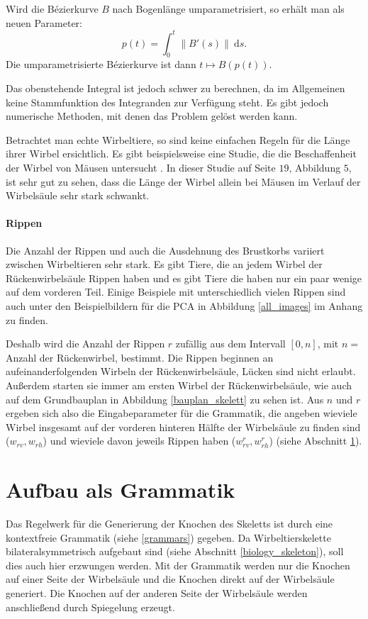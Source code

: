 Wird die Bézierkurve $B$ nach Bogenlänge umparametrisiert, so erhält man als neuen Parameter:
\[p(t) = \int_0^t \| B'(s) \| ~\mathrm{d}s. \]
Die umparametrisierte Bézierkurve ist dann $t \mapsto B(p(t))$.

Das obenstehende Integral ist jedoch schwer zu berechnen, da im Allgemeinen keine Stammfunktion des Integranden zur Verfügung steht. Es gibt jedoch numerische Methoden, mit denen das Problem gelöst werden kann. \cite{ArcLengthParametrization}

Betrachtet man echte Wirbeltiere, so sind keine einfachen Regeln für die Länge ihrer Wirbel ersichtlich. Es gibt beispielsweise eine Studie, die die Beschaffenheit der  Wirbel von Mäusen untersucht \cite{MouseVertebrae}. In dieser Studie auf Seite $19$, Abbildung $5$, ist sehr gut zu sehen, dass die Länge der Wirbel allein bei Mäusen im Verlauf der Wirbelsäule sehr stark schwankt.

\paragraph{Rippen}
Die Anzahl der Rippen und auch die Ausdehnung des Brustkorbs variiert zwischen Wirbeltieren sehr stark. Es gibt Tiere, die an jedem Wirbel der Rückenwirbelsäule Rippen haben und es gibt Tiere die haben nur ein paar wenige auf dem vorderen Teil. Einige Beispiele mit unterschiedlich vielen Rippen sind auch unter den Beispielbildern für die PCA in Abbildung \ref{all_images} im Anhang zu finden.

Deshalb wird die Anzahl der Rippen $r$ zufällig aus dem Intervall $ [0, n]$, mit $n =$ Anzahl der Rückenwirbel, bestimmt.
Die Rippen beginnen an aufeinanderfolgenden Wirbeln der Rückenwirbelsäule, Lücken sind nicht erlaubt. Außerdem starten sie immer am ersten Wirbel der Rückenwirbelsäule, wie auch auf dem Grundbauplan in Abbildung \ref{bauplan_skelett} zu sehen ist. Aus $n$ und $r$ ergeben sich also die Eingabeparameter für die Grammatik, die angeben wieviele Wirbel insgesamt auf der vorderen \bzw hinteren Hälfte der Wirbelsäule zu finden sind ($w_{rv}, w_{rh}$) und wieviele davon jeweils Rippen haben ($w_{rv}^r, w_{rh}^r$) (siehe Abschnitt \ref{section:grammar}).


\section{Aufbau als Grammatik}
\label{section:grammar}

Das Regelwerk für die Generierung der Knochen des Skeletts ist durch eine kontextfreie Grammatik (siehe \ref{grammars}) gegeben. Da Wirbeltierskelette bilateralsymmetrisch aufgebaut sind (siehe Abschnitt \ref{biology_skeleton}), soll dies auch hier erzwungen werden. Mit der Grammatik werden nur die Knochen auf einer Seite der Wirbelsäule und die Knochen direkt auf der Wirbelsäule generiert. Die Knochen auf der anderen Seite der Wirbelsäule werden anschließend durch Spiegelung erzeugt.

